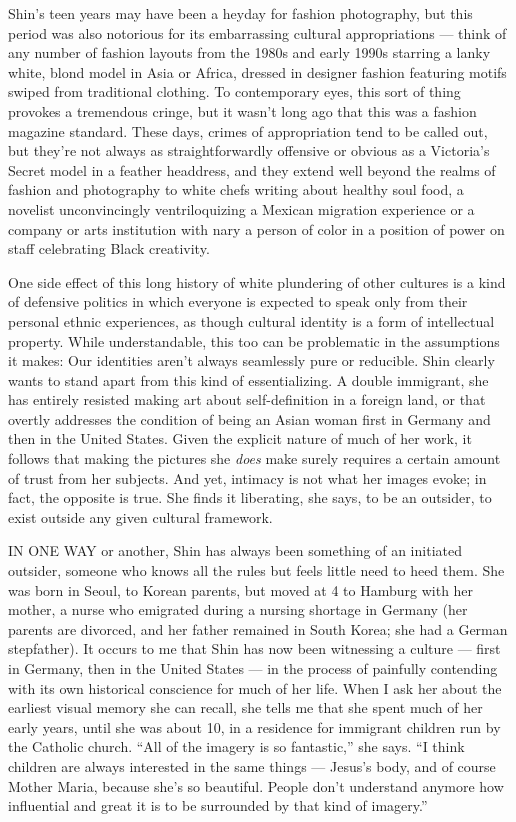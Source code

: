 Shin's teen years may have been a heyday for fashion photography, but
this period was also notorious for its embarrassing cultural
appropriations --- think of any number of fashion layouts from the 1980s
and early 1990s starring a lanky white, blond model in Asia or Africa,
dressed in designer fashion featuring motifs swiped from traditional
clothing. To contemporary eyes, this sort of thing provokes a tremendous
cringe, but it wasn't long ago that this was a fashion magazine
standard. These days, crimes of appropriation tend to be called out, but
they're not always as straightforwardly offensive or obvious as a
Victoria's Secret model in a feather headdress, and they extend well
beyond the realms of fashion and photography to white chefs writing
about healthy soul food, a novelist unconvincingly ventriloquizing a
Mexican migration experience or a company or arts institution with nary
a person of color in a position of power on staff celebrating Black
creativity.

One side effect of this long history of white plundering of other
cultures is a kind of defensive politics in which everyone is expected
to speak only from their personal ethnic experiences, as though cultural
identity is a form of intellectual property. While understandable, this
too can be problematic in the assumptions it makes: Our identities
aren't always seamlessly pure or reducible. Shin clearly wants to stand
apart from this kind of essentializing. A double immigrant, she has
entirely resisted making art about self-definition in a foreign land, or
that overtly addresses the condition of being an Asian woman first in
Germany and then in the United States. Given the explicit nature of much
of her work, it follows that making the pictures she \emph{does} make
surely requires a certain amount of trust from her subjects. And yet,
intimacy is not what her images evoke; in fact, the opposite is true.
She finds it liberating, she says, to be an outsider, to exist outside
any given cultural framework.

IN ONE WAY or another, Shin has always been something of an initiated
outsider, someone who knows all the rules but feels little need to heed
them. She was born in Seoul, to Korean parents, but moved at 4 to
Hamburg with her mother, a nurse who emigrated during a nursing shortage
in Germany (her parents are divorced, and her father remained in South
Korea; she had a German stepfather). It occurs to me that Shin has now
been witnessing a culture --- first in Germany, then in the United
States --- in the process of painfully contending with its own
historical conscience for much of her life. When I ask her about the
earliest visual memory she can recall, she tells me that she spent much
of her early years, until she was about 10, in a residence for immigrant
children run by the Catholic church. ``All of the imagery is so
fantastic,'' she says. ``I think children are always interested in the
same things --- Jesus's body, and of course Mother Maria, because she's
so beautiful. People don't understand anymore how influential and great
it is to be surrounded by that kind of imagery.''


